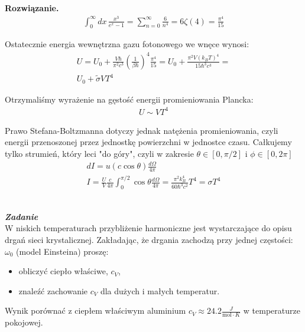 \documentclass[11pt,a4paper]{article}
\newcounter{zadanie}\newcommand{\zadanie}[1][]{\addtocounter{zadanie}{1} ~\\ {\bf \emph{Zadanie \arabic{zadanie} #1 }} \\}
\newenvironment{solution}{\vspace{1cm} \par\textbf{Rozwiązanie.} \vspace{1cm}}{}
\begin{document}
\begin{solution}
\begin{align*}
  \int_0^{\infty} dx \, \frac{x^3}{e^{x} - 1} = 
  \sum_{n=0}^{\infty} \frac{6}{n^4} = 
  6 \zeta(4) = 
  \frac{\pi^4}{15}
\end{align*}

Ostatecznie energia wewnętrzna gazu fotonowego we wnęce wynosi:
\begin{align*}
  U = U_{0} + \frac{V \hbar}{\pi^2 c^3} \left( \frac{1}{\beta \hbar} \right)^4 \frac{\pi^4}{15} = 
  U_{0} +
  \frac{\pi^2 V (k_B T)^4}{15 \hbar^3 c^3} = \\
  U_{0} + \tilde{\sigma} V T^4
\end{align*}

Otrzymaliśmy wyrażenie na gęstość energii promieniowania Plancka:
\begin{align*}
  U \sim V T^4 
\end{align*}

Prawo Stefana-Boltzmanna dotyczy jednak natężenia promieniowania, 
czyli energii przenoszonej przez jednostkę powierzchni w jednostce czasu.
Całkujemy tylko strumień, który leci "do góry", czyli w zakresie 
$\theta \in [0, \pi/2]$ i $\phi \in [0, 2\pi]$
\begin{align*}
  dI = u (c \cos \theta) \frac{d\Omega}{4\pi} \\
  I = \frac{U}{V} \frac{c}{4\pi} \int_0^{\pi/2} \cos \theta\frac{d\Omega}{4\pi}  =
  \frac{\pi^2 k_B^4}{60 \hbar^3 c^2} T^4 = \sigma T^4
\end{align*}

\newpage 
\end{solution}
\zadanie[]

W niskich temperaturach przybliżenie harmoniczne jest wystarczające do 
opisu drgań sieci krystalicznej.  Zakładając, że drgania zachodzą przy 
jednej częstości: $\omega_0$ (model Einsteina) proszę:
\begin{itemize}
  \item obliczyć ciepło właściwe, $c_V$,
  \item znaleźć zachowanie $c_V$  dla dużych i małych temperatur.
\end{itemize}

Wynik porównać z ciepłem właściwym aluminium 
$c_V \approx 24.2 \frac{J}{\mathrm{mol}\cdot K}$ w temperaturze pokojowej.

\end{document}
